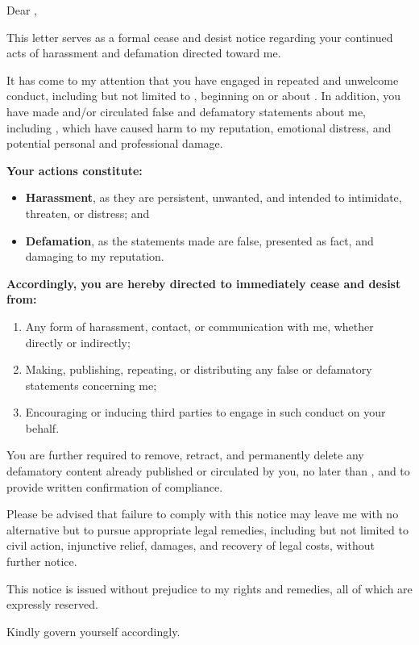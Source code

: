 
Dear \recipientName{},

This letter serves as a formal cease and desist notice regarding your continued acts of harassment and defamation directed toward me.

It has come to my attention that you have engaged in repeated and unwelcome conduct, including but not limited to \OffenseDescription{}, beginning on or about \OffenseDate{}. In addition, you have made and/or circulated false and defamatory statements about me, including \DefamationDescription{}, which have caused harm to my reputation, emotional distress, and potential personal and professional damage.

\textbf{Your actions constitute:}
\begin{itemize}
  \item \textbf{Harassment}, as they are persistent, unwanted, and intended to intimidate, threaten, or distress; and
  \item \textbf{Defamation}, as the statements made are false, presented as fact, and damaging to my reputation.
\end{itemize}

\textbf{Accordingly, you are hereby directed to immediately cease and desist from:}
\begin{enumerate}
  \item Any form of harassment, contact, or communication with me, whether directly or indirectly;
  \item Making, publishing, repeating, or distributing any false or defamatory statements concerning me;
  \item Encouraging or inducing third parties to engage in such conduct on your behalf.
\end{enumerate}

You are further required to remove, retract, and permanently delete any defamatory content already published or circulated by you, no later than \Deadline{}, and to provide written confirmation of compliance.

Please be advised that failure to comply with this notice may leave me with no alternative but to pursue appropriate legal remedies, including but not limited to civil action, injunctive relief, damages, and recovery of legal costs, without further notice.

This notice is issued without prejudice to my rights and remedies, all of which are expressly reserved.

Kindly govern yourself accordingly.


